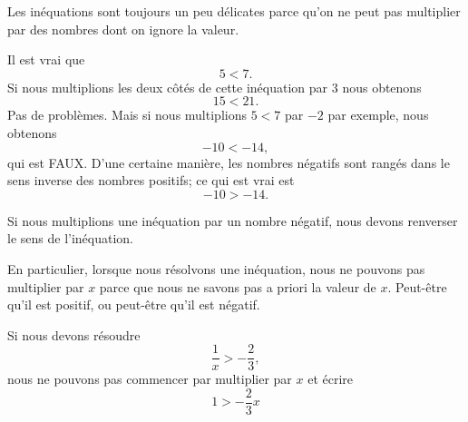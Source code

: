 Les inéquations sont toujours un peu délicates parce qu'on ne peut pas multiplier par des nombres dont on ignore la valeur.

\begin{example}
    Il est vrai que
    \begin{equation}
        5<7.
    \end{equation}
    Si nous multiplions les deux côtés de cette inéquation par \( 3\) nous obtenons
    \begin{equation}
        15<21.
    \end{equation}
    Pas de problèmes. Mais si nous multiplions \( 5<7\) par \( -2\) par exemple, nous obtenons
    \begin{equation}
        -10 < -14,
    \end{equation}
    qui est FAUX. D'une certaine manière, les nombres négatifs sont rangés dans le sens inverse des nombres positifs; ce qui est vrai est
    \begin{equation}
        -10 > -14.
    \end{equation}
\end{example}

\begin{Aretenir}
    Si nous multiplions une inéquation par un nombre négatif, nous devons renverser le sens de l'inéquation.
\end{Aretenir}

En particulier, lorsque nous résolvons une inéquation, nous ne pouvons pas multiplier par \( x\) parce que nous ne savons pas a priori la valeur de \( x\). Peut-être qu'il est positif, ou peut-être qu'il est négatif.

\begin{example}
    Si nous devons résoudre
    \begin{equation}
        \frac{1}{ x }>-\frac{ 2 }{ 3 },
    \end{equation}
    nous ne pouvons pas commencer par multiplier par \( x\) et écrire
    \begin{equation}
        1>-\frac{ 2 }{ 3 }x
    \end{equation}
\end{example}



